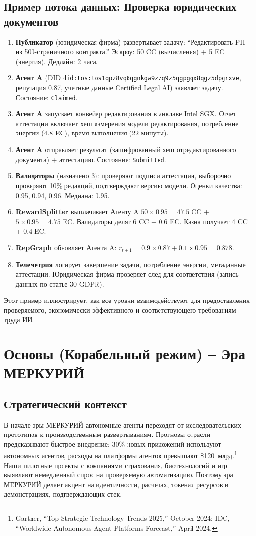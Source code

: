 \documentclass[11pt]{article}
\begin{document}
\subsection{Пример потока данных: Проверка юридических документов}
\begin{enumerate}[label=\arabic*.]
  \item \textbf{Публикатор} (юридическая фирма) развертывает задачу: ``Редактировать PII из 500-страничного контракта.'' Эскроу: 50 CC (вычисления) + 5 EC (энергия). Дедлайн: 2 часа.
  \item \textbf{Агент A} (DID \texttt{did:tos:tos1qpz8vq6qgnkgw9zzq9z5qgpgqx8qgz5dpgrxve}, репутация 0.87, учетные данные Certified Legal AI) заявляет задачу. Состояние: \texttt{Claimed}.
  \item \textbf{Агент A} запускает конвейер редактирования в анклаве Intel SGX. Отчет аттестации включает хеш измерения модели редактирования, потребление энергии (4.8 EC), время выполнения (22 минуты).
  \item \textbf{Агент A} отправляет результат (зашифрованный хеш отредактированного документа) + аттестацию. Состояние: \texttt{Submitted}.
  \item \textbf{Валидаторы} (назначено 3): проверяют подписи аттестации, выборочно проверяют 10\% редакций, подтверждают версию модели. Оценки качества: 0.95, 0.94, 0.96. Медиана: 0.95.
  \item \textbf{RewardSplitter} выплачивает Агенту A $50 \times 0.95 = 47.5$ CC + $5 \times 0.95 = 4.75$ EC. Валидаторы делят 6 CC + 0.6 EC. Казна получает 4 CC + 0.4 EC.
  \item \textbf{RepGraph} обновляет Агента A: $r_{t+1} = 0.9 \times 0.87 + 0.1 \times 0.95 = 0.878$.
  \item \textbf{Телеметрия} логирует завершение задачи, потребление энергии, метаданные аттестации. Юридическая фирма проверяет след для соответствия (запись данных по статье 30 GDPR).
\end{enumerate}

Этот пример иллюстрирует, как все уровни взаимодействуют для предоставления проверяемого, экономически эффективного и соответствующего требованиям труда ИИ.

\section{Основы (Корабельный режим) -- Эра МЕРКУРИЙ}
\subsection{Стратегический контекст}
В начале эры МЕРКУРИЙ автономные агенты переходят от исследовательских прототипов к производственным развертываниям. Прогнозы отрасли предсказывают быстрое внедрение: 30\% новых приложений используют автономных агентов, расходы на платформы агентов превышают \$120~млрд.\footnote{Gartner, ``Top Strategic Technology Trends 2025,'' October 2024; IDC, ``Worldwide Autonomous Agent Platforms Forecast,'' April 2024.} Наши пилотные проекты с компаниями страхования, биотехнологий и игр выявляют немедленный спрос на проверяемую автоматизацию. Поэтому эра МЕРКУРИЙ делает акцент на идентичности, расчетах, токенах ресурсов и демонстрациях, подтверждающих стек.
\end{document}
